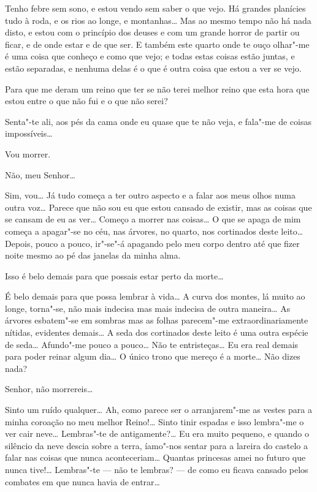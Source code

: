 Tenho febre sem sono, e estou vendo sem saber o que vejo. Há grandes
planícies tudo à roda, e os rios ao longe, e montanhas\ldots{} Mas ao
mesmo tempo não há nada disto, e estou com o princípio dos deuses e
com um grande horror de partir ou ficar, e de onde estar e de que
ser. E também este quarto onde te ouço olhar"-me é uma coisa que
conheço e como que vejo; e todas estas coisas estão juntas, e estão
separadas, e nenhuma delas é o que é outra coisa que estou a ver se
vejo.

Para que me deram um reino que ter se não terei melhor reino que esta
hora que estou entre o que não fui e o que não serei?

 Senta"-te ali, aos pés da cama onde eu quase que te não
veja, e fala"-me de coisas impossíveis\ldots{}

Vou morrer.

 Não, meu Senhor\ldots{}

 Sim, vou\ldots{} Já tudo começa a ter outro aspecto e a falar
aos meus olhos numa outra voz\ldots{} Parece que não sou eu que estou
cansado de existir, mas as coisas que se cansam de eu as ver\ldots{}
Começo a morrer nas coisas\ldots{} O que se apaga de mim começa a
apagar"-se no céu, nas árvores, no quarto, nos cortinados deste leito…
Depois, pouco a pouco, ir"-se"-á apagando pelo meu corpo dentro até que
fizer noite mesmo ao pé das janelas da minha alma. 

 Isso é belo demais para que possais estar perto da morte\ldots{}

 É belo demais para que possa lembrar à vida\ldots{} A curva
dos montes, lá muito ao longe, torna"-se, não mais indecisa mas mais
indecisa de outra maneira\ldots{} As árvores esbatem"-se em sombras mas as
folhas parecem"-me extraordinariamente nítidas, evidentes demais\ldots{} A
seda dos cortinados deste leito é uma outra espécie de seda\ldots{}
Afundo"-me pouco a pouco\ldots{} Não te entristeças\ldots{} Eu era real demais
para poder reinar algum dia\ldots{} O único trono que mereço é a morte\ldots{}
Não dizes nada?

 Senhor, não morrereis\ldots{}

 Sinto um ruído qualquer\ldots{} Ah, como parece ser o
arranjarem"-me as vestes para a minha coroação no meu melhor Reino!\ldots{}
Sinto tinir espadas e isso lembra"-me o ver cair neve\ldots{} Lembras"-te de
antigamente?\ldots{} Eu era muito pequeno, e quando o silêncio da neve
descia sobre a terra, íamo"-nos sentar para a lareira do castelo a
falar nas coisas que nunca aconteceriam\ldots{} Quantas princesas amei no
futuro que nunca tive!\ldots{} Lembras"-te --- não te lembras? --- de como eu
ficava cansado pelos combates em que nunca havia de entrar\ldots{}

